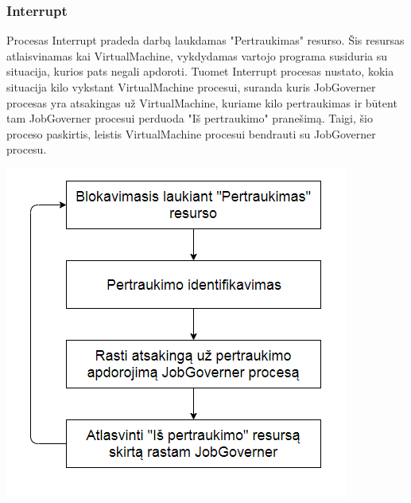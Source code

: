 \documentclass{scrartcl}
\begin{document}
      \subsubsection{Interrupt}
        Procesas Interrupt pradeda darbą laukdamas "Pertraukimas" resurso. Šis resursas atlaisvinamas kai VirtualMachine, vykdydamas vartojo programa susiduria su situacija, kurios pats negali apdoroti. Tuomet Interrupt procesas nustato, kokia situacija kilo vykstant VirtualMachine procesui, suranda kuris JobGoverner procesas yra atsakingas už VirtualMachine, kuriame kilo pertraukimas ir būtent tam JobGoverner procesui perduoda "Iš pertraukimo" pranešimą. Taigi, šio proceso paskirtis, leistis VirtualMachine procesui bendrauti su JobGoverner procesu.
        \begin{center}
          \includegraphics[scale=1]{Interrupt}
        \end{center}
\end{document}
